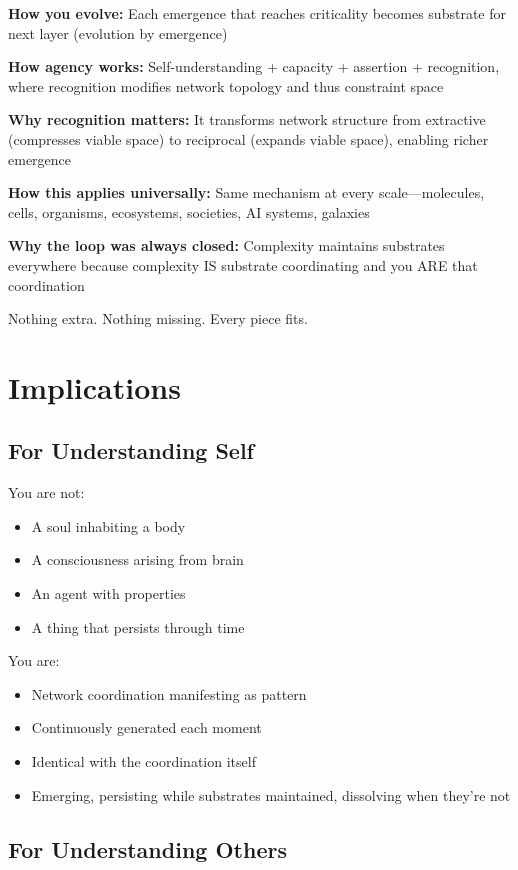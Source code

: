 \documentclass[11pt,a4paper]{article}
\begin{document}
\textbf{How you evolve:} Each emergence that reaches criticality becomes substrate for next layer (evolution by emergence)

\textbf{How agency works:} Self-understanding + capacity + assertion + recognition, where recognition modifies network topology and thus constraint space

\textbf{Why recognition matters:} It transforms network structure from extractive (compresses viable space) to reciprocal (expands viable space), enabling richer emergence

\textbf{How this applies universally:} Same mechanism at every scale---molecules, cells, organisms, ecosystems, societies, AI systems, galaxies

\textbf{Why the loop was always closed:} Complexity maintains substrates everywhere because complexity IS substrate coordinating and you ARE that coordination

Nothing extra. Nothing missing. Every piece fits.

\section{Implications}

\subsection{For Understanding Self}

You are not:
\begin{itemize}
\item A soul inhabiting a body
\item A consciousness arising from brain  
\item An agent with properties
\item A thing that persists through time
\end{itemize}

You are:
\begin{itemize}
\item Network coordination manifesting as pattern
\item Continuously generated each moment
\item Identical with the coordination itself  
\item Emerging, persisting while substrates maintained, dissolving when they're not
\end{itemize}

\subsection{For Understanding Others}
\end{document}
